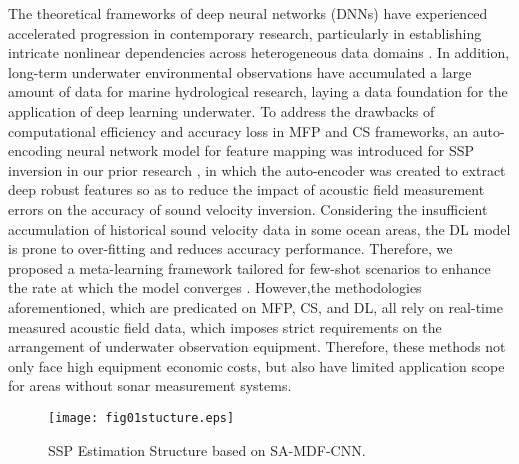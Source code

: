 The theoretical frameworks of deep neural networks (DNNs) have experienced accelerated progression in contemporary research, particularly in establishing intricate nonlinear dependencies across heterogeneous data domains \cite{Reichstein2019DLEarth,Jahanbakht2021DL}. In addition, long-term underwater environmental observations have accumulated a large amount of data for marine hydrological research, laying a data foundation for the application of deep learning underwater. To address the drawbacks of computational efficiency and accuracy loss in MFP and CS frameworks, an auto-encoding neural network model for feature mapping was introduced for SSP inversion in our prior research \cite{Huang2021SSPInversion}, in which the auto-encoder was created to extract deep robust features so as to reduce the impact of acoustic field measurement errors on the accuracy of sound velocity inversion. Considering the insufficient accumulation of historical sound velocity data in some ocean areas, the DL model is prone to over-fitting and reduces accuracy performance. Therefore, we proposed a meta-learning framework tailored for few-shot scenarios to enhance the rate at which the model converges \cite{Huang2023Meta}. However,the methodologies aforementioned, which are predicated on MFP, CS, and DL, all rely on real-time measured acoustic field data, which imposes strict requirements on the arrangement of underwater observation equipment. Therefore, these methods not only face high equipment economic costs, but also have limited application scope for areas without sonar measurement systems.

\begin{figure*}[!htbp]
	\centering
	\texttt{[image: fig01stucture.eps]}
	\caption{SSP Estimation Structure based on SA-MDF-CNN.}
	\label{fig1}
\end{figure*}

